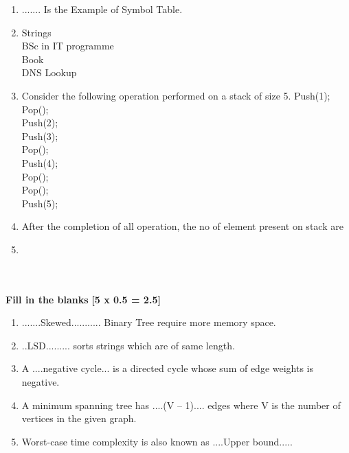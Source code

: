 \documentclass[12pt ,a4paper]{exam}
\begin{document}
\begin{enumerate}[start=1,label={\bfseries Q\arabic*)}]
   \item ....... Is the Example of Symbol Table.
   \item[]   
   \begin{oneparchoices}
   	\choice  Strings\\%
   	\choice  BSc in IT programme\\
   	\choice Book\\
   	\choice DNS Lookup \checkmark
   \end{oneparchoices}
  \item Consider the following operation performed on a stack of size 5.
	Push(1);\\
	Pop();\\
	Push(2);\\
	Push(3);\\
	Pop();\\
	Push(4);\\
	Pop();\\
	Pop();\\
	Push(5);\\
	
	\item []After the completion of all operation, the no of element present on stack are
	\item[]   
	\begin{oneparchoices}
		  \checkmark\\%
		\\
		\\
	\end{oneparchoices}
	  

\end{enumerate}

	
	\noindent \textbf{Fill in the blanks} \hfill\textbf{ [5 x 0.5 = 2.5]}
	
	\begin{enumerate}[start=11,label={\bfseries Q\arabic*)}]
		\item    .......Skewed........... Binary Tree require more memory space.
		\item ..LSD......... sorts strings which are  of same length.
		\item A ....negative cycle... is a directed cycle whose sum of edge weights is negative.
		\item A minimum spanning tree has ....(V – 1).... edges where V is the number of vertices in the given graph.
		\item Worst-case time complexity is also known as ....Upper bound.....
	\end{enumerate}
\end{document}
